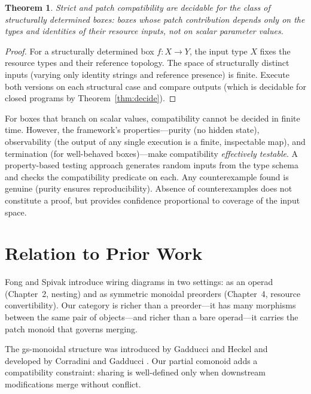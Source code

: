 \documentclass[11pt]{article}
\newtheorem{theorem}{Theorem}[section]
\begin{document}
    \begin{theorem}\label{thm:compat}
        Strict and patch compatibility are decidable for the class of \emph{structurally
        determined} boxes: boxes whose patch contribution depends only on the types and
        identities of their resource inputs, not on scalar parameter values.
    \end{theorem}

    \begin{proof}
        For a structurally determined box $f \colon X \to Y$, the input type $X$ fixes
        the resource types and their reference topology. The space of structurally distinct
        inputs (varying only identity strings and reference presence) is finite. Execute
        both versions on each structural case and compare outputs (which is decidable for
        closed programs by Theorem~\ref{thm:decide}).
    \end{proof}

    For boxes that branch on scalar values, compatibility cannot be decided in finite
    time. However, the framework's properties---purity (no hidden state), observability
    (the output of any single execution is a finite, inspectable map), and termination
    (for well-behaved boxes)---make compatibility \emph{effectively testable}. A
    property-based testing approach generates random inputs from the type schema and checks
    the compatibility predicate on each. Any counterexample found is genuine (purity
    ensures reproducibility). Absence of counterexamples does not constitute a proof, but
    provides confidence proportional to coverage of the input space.

    \section{Relation to Prior Work}

    Fong and Spivak \cite{fong2019invitation} introduce wiring diagrams in two settings:
    as an operad (Chapter~2, nesting) and as symmetric monoidal preorders (Chapter~4,
    resource convertibility). Our category is richer than a preorder---it has many
    morphisms between the same pair of objects---and richer than a bare operad---it carries
    the patch monoid that governs merging.

    The gs-monoidal structure was introduced by Gadducci and Heckel
    \cite{gadducci1997inductive} and developed by Corradini and Gadducci
    \cite{corradini1999algebraic}. Our partial comonoid adds a compatibility constraint:
    sharing is well-defined only when downstream modifications merge without conflict.
\end{document}

